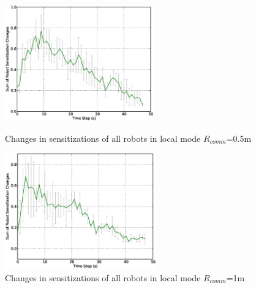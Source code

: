 \documentclass[letterpaper, 10 pt, conference]{ieeeconf}  %
\begin{document}
\begin{figure}
\begin{minipage}[t]{0.5\linewidth}
\centering
\includegraphics[height=5cm, angle=0]
{images/local-500cm/RobotSensitizationStat-Total-50steps.eps}
\caption{\small Changes in sensitizations of all robots in local mode $R_{comm}$=0.5m}
\label{fig:sensitization-stat} %
\end{minipage}
\hspace{0.5cm}
\begin{minipage}[t]{0.5\linewidth}
\centering
\includegraphics[height=5cm, angle=0]{images/local-1m/RobotSensitizationStat-Total-50steps.eps}
\caption{\small Changes in sensitizations of all robots in local mode $R_{comm}$=1m}
\label{fig:translation-stat} %
\end{minipage}
\end{figure}
\end{document}

